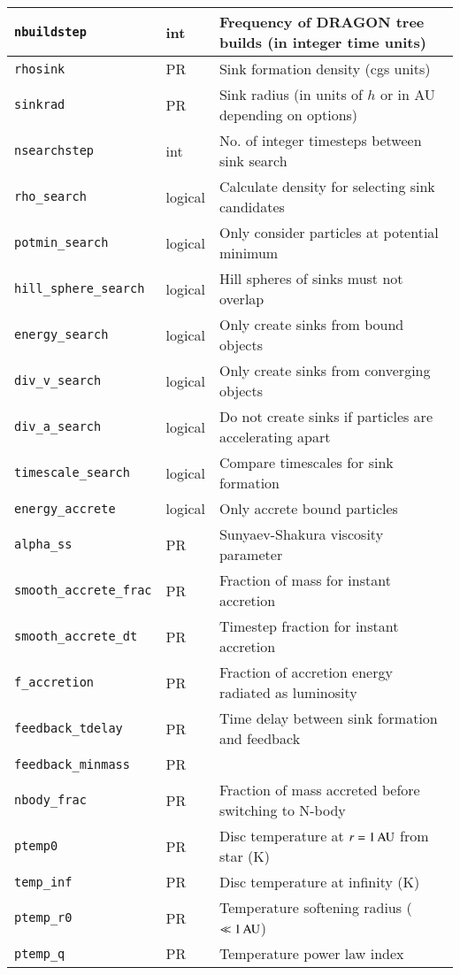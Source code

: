 \documentclass[a4paper]{article}
\newcommand{\var}[1]{\texttt{#1}}
\begin{document}
\begin{center}
\begin{supertabular}{|p{3cm}|p{2cm}|p{8cm}|}
\var{nbuildstep} & int      & Frequency of DRAGON tree builds (in integer time units) \\ \hline
\var{rhosink}    & PR       & Sink formation density (cgs units) \\
\var{sinkrad}    & PR       & Sink radius (in units of $h$ or in AU depending on options) \\
\var{nsearchstep} & int     & No. of integer timesteps between sink search \\
\var{rho\_search} & logical & Calculate density for selecting sink candidates \\
\var{potmin\_search} & logical & Only consider particles at potential minimum \\
\var{hill\_sphere\_search} & logical & Hill spheres of sinks must not overlap \\
\var{energy\_search}  & logical & Only create sinks from bound objects \\
\var{div\_v\_search}  & logical & Only create sinks from converging objects \\
\var{div\_a\_search}  & logical & Do not create sinks if particles are accelerating apart \\
\var{timescale\_search} & logical & Compare timescales for sink formation \\ \hline
\var{energy\_accrete} & logical & Only accrete bound particles \\
\var{alpha\_ss}  & PR       & Sunyaev-Shakura viscosity parameter \\
\var{smooth\_accrete\_frac} & PR & Fraction of mass for instant accretion \\
\var{smooth\_accrete\_dt}   & PR & Timestep fraction for instant accretion \\
\var{f\_accretion}    & PR & Fraction of accretion energy radiated as luminosity \\
\var{feedback\_tdelay} & PR & Time delay between sink formation and feedback\\
\var{feedback\_minmass} & PR & \\ \hline
\var{nbody\_frac}     & PR & Fraction of mass accreted before switching to N-body \\ \hline
\var{ptemp0}     & PR & Disc temperature at $r = 1\,{\rm AU}$ from star (K) \\
\var{temp\_inf}  & PR & Disc temperature at infinity (K) \\
\var{ptemp\_r0}  & PR & Temperature softening radius ($\ll 1\,{\rm AU}$) \\
\var{ptemp\_q}   & PR & Temperature power law index \\

\end{supertabular}
\end{center}
\end{document}
